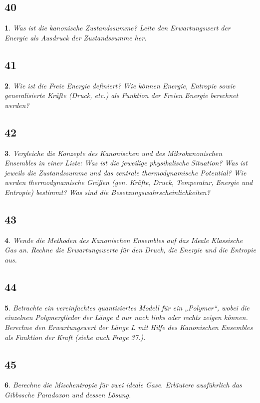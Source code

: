 \documentclass[12pt,a4paper]{report}
\newtheorem{myfrag}{}%
\begin{document}
\subsection{40}
\begin{myfrag}
Was ist die kanonische Zustandssumme? Leite den Erwartungswert der Energie
als Ausdruck der Zustandssumme her.
\end{myfrag}
\subsection{41}
\begin{myfrag}
Wie ist die Freie Energie definiert? Wie können Energie, Entropie sowie
generalisierte Kräfte (Druck, etc.) als Funktion der Freien Energie berechnet
werden?
\end{myfrag}
\subsection{42}
\begin{myfrag}
Vergleiche die Konzepte des Kanonischen und des Mikrokanonischen Ensembles
in einer Liste: Was ist die jeweilige physikalische Situation? Was ist jeweils die
Zustandssumme und das zentrale thermodynamische Potential? Wie werden
thermodynamische Größen (gen. Kräfte, Druck, Temperatur, Energie und
Entropie) bestimmt? Was sind die Besetzungswahrscheinlichkeiten?
\end{myfrag}
\subsection{43}
\begin{myfrag}
Wende die Methoden des Kanonischen Ensembles auf das Ideale Klassische Gas
an. Rechne die Erwartungswerte für den Druck, die Energie und die Entropie aus.
\end{myfrag}
\subsection{44}
\begin{myfrag}
Betrachte ein vereinfachtes quantisiertes Modell für ein „Polymer“, wobei die
einzelnen Polymerglieder der Länge d nur nach links oder rechts zeigen können.
Berechne den Erwartungswert der Länge L mit Hilfe des Kanonischen Ensembles
als Funktion der Kraft (siehe auch Frage 37.).
\end{myfrag}
\subsection{45}
\begin{myfrag}
Berechne die Mischentropie für zwei ideale Gase. Erläutere ausführlich das
Gibbssche Paradoxon und dessen Lösung.
\end{myfrag}
\end{document}
